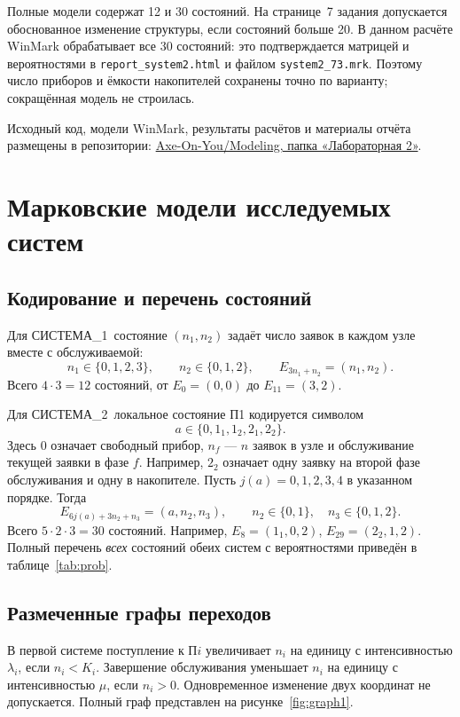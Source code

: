 \documentclass[a4paper,12pt]{article}
\newcommand{\sysone}{СИСТЕМА\_1}
\newcommand{\systwo}{СИСТЕМА\_2}
\begin{document}
Полные модели содержат 12 и 30 состояний. На странице~7 задания допускается обоснованное изменение структуры, если состояний больше 20. В данном расчёте WinMark обрабатывает все 30 состояний: это подтверждается матрицей и вероятностями в \texttt{report\_system2.html} и файлом \texttt{system2\_73.mrk}. Поэтому число приборов и ёмкости накопителей сохранены точно по варианту; сокращённая модель не строилась.

Исходный код, модели WinMark, результаты расчётов и материалы отчёта размещены в репозитории:
\href{https://github.com/Axe-On-You/Modeling/tree/main/\%D0\%9B\%D0\%B0\%D0\%B1\%D0\%BE\%D1\%80\%D0\%B0\%D1\%82\%D0\%BE\%D1\%80\%D0\%BD\%D0\%B0\%D1\%8F\%202}
{Axe-On-You/Modeling, папка «Лабораторная 2»}.

\section{Марковские модели исследуемых систем}
\subsection{Кодирование и перечень состояний}
Для \sysone\ состояние $(n_1,n_2)$ задаёт число заявок в каждом узле вместе с обслуживаемой:
\[
n_1\in\{0,1,2,3\},\qquad n_2\in\{0,1,2\},\qquad
E_{3n_1+n_2}=(n_1,n_2).
\]
Всего $4\cdot3=12$ состояний, от $E_0=(0,0)$ до $E_{11}=(3,2)$.

Для \systwo\ локальное состояние П1 кодируется символом
\[
a\in\{0,1_1,1_2,2_1,2_2\}.
\]
Здесь $0$ означает свободный прибор, $n_f$ --- $n$ заявок в узле и обслуживание текущей заявки в фазе $f$. Например, $2_2$ означает одну заявку на второй фазе обслуживания и одну в накопителе. Пусть $j(a)=0,1,2,3,4$ в указанном порядке. Тогда
\[
E_{6j(a)+3n_2+n_3}=(a,n_2,n_3),\qquad
n_2\in\{0,1\},\quad n_3\in\{0,1,2\}.
\]
Всего $5\cdot2\cdot3=30$ состояний. Например, $E_8=(1_1,0,2)$, $E_{29}=(2_2,1,2)$. Полный перечень \emph{всех} состояний обеих систем с вероятностями приведён в таблице~\ref{tab:prob}.

\subsection{Размеченные графы переходов}
В первой системе поступление к П$i$ увеличивает $n_i$ на единицу с интенсивностью $\lambda_i$, если $n_i<K_i$. Завершение обслуживания уменьшает $n_i$ на единицу с интенсивностью $\mu$, если $n_i>0$. Одновременное изменение двух координат не допускается. Полный граф представлен на рисунке~\ref{fig:graph1}.
\end{document}
